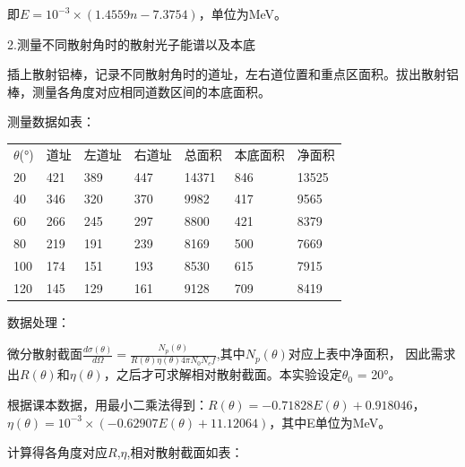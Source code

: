 \documentclass[font=default]{mpltx}
\begin{document}
即$E = {10}^{-3} \times (1.4559n - 7.3754)$，单位为MeV。

2.测量不同散射角时的散射光子能谱以及本底

插上散射铝棒，记录不同散射角时的道址，左右道位置和重点区面积。拔出散射铝棒，测量各角度对应相同道数区间的本底面积。

测量数据如表：

\begin{table}[!ht]
    \centering
    \begin{tabular}{|l|l|l|l|l|l|l|}
    \hline
$\theta$(°)                & 道址                 &左道址            &右道址            &总面积     &本底面积    &净面积 \\
20                   & 421                  &389                &447            &14371     &846        &13525 \\
40                   & 346                   &320                &370           &9982      &417        &9565 \\
60                   & 266                   &245                &297           &8800      &421        &8379  \\
80                   & 219                  &191                  &239          &8169      &500        &7669  \\
100                  & 174                  &151                 &193           &8530      &615        &7915  \\
120                  &145                   &129                 &161           &9128      &709        &8419  \\
    \end{tabular}
\end{table}

数据处理：

微分散射截面$\frac{d \sigma (\theta)}{d \Omega} = \frac{N_p(\theta)}{R(\theta)\eta(\theta)4 \pi N_0 N_e f}$,其中$N_p(\theta)$对应上表中净面积，
因此需求出$R(\theta)$和$\eta(\theta)$，之后才可求解相对散射截面。本实验设定$\theta_0$ = 20°。

根据课本数据，用最小二乘法得到：$R(\theta) =-0.71828 E(\theta) + 0.918046$，
$\eta(\theta) = 10^{-3} \times (-0.62907E(\theta) + 11.12064)$，其中E单位为MeV。

计算得各角度对应$R$,$\eta$,相对散射截面如表：
\end{document}
